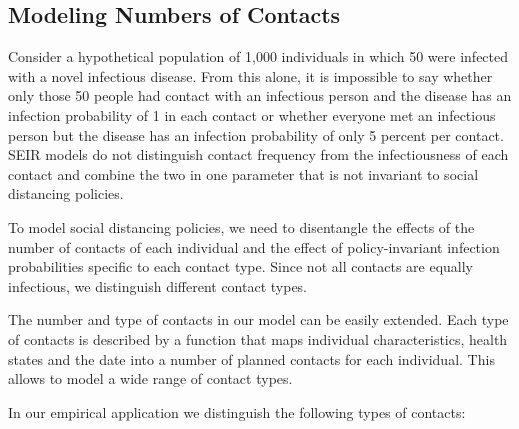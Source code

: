 \subsection{Modeling Numbers of Contacts}
\label{sec:number_of_contacts}

Consider a hypothetical population of 1,000 individuals in which 50 were infected with a
novel infectious disease. From this alone, it is impossible to say whether only
those 50 people had contact with an infectious person and the disease has an infection
probability of 1 in each contact or whether everyone met an infectious person but the
disease has an infection probability of only 5 percent per contact. SEIR models do not
distinguish contact frequency from the infectiousness of each contact and
combine the two in one parameter that is not invariant to social distancing policies.

To model social distancing policies, we need to disentangle the effects of the number of
contacts of each individual and the effect of policy-invariant infection probabilities
specific to each contact type. Since not all contacts are equally infectious, we
distinguish different contact types.

The number and type of contacts in our model can be easily extended. Each type of
contacts is described by a function that maps individual characteristics, health states
and the date into a number of planned contacts for each individual. This allows to model
a wide range of contact types.

In our empirical application we distinguish the following types of contacts:

